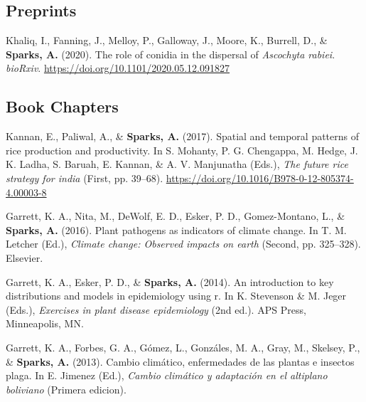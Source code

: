 \documentclass[11pt, a4paper]{awesome-cv}
\begin{document}
\endgroup

\hypertarget{preprints}{%
\subsection{Preprints}\label{preprints}}

\begingroup
\setlength{\parindent}{-0.5in}
\setlength{\leftskip}{0.5in}

\hypertarget{refs_preprints}{}
\leavevmode\hypertarget{ref-Khaliq2020}{}%
Khaliq, I., Fanning, J., Melloy, P., Galloway, J., Moore, K., Burrell, D., \& \textbf{Sparks, A.} (2020). The role of conidia in the dispersal of \emph{Ascochyta rabiei}. \emph{bioRxiv}. \url{https://doi.org/10.1101/2020.05.12.091827}

\endgroup

\hypertarget{book-chapters}{%
\subsection{Book Chapters}\label{book-chapters}}

\begingroup
\setlength{\parindent}{-0.5in}
\setlength{\leftskip}{0.5in}

\hypertarget{refs_books}{}
\leavevmode\hypertarget{ref-Kannan2017}{}%
Kannan, E., Paliwal, A., \& \textbf{Sparks, A.} (2017). Spatial and temporal patterns of rice production and productivity. In S. Mohanty, P. G. Chengappa, M. Hedge, J. K. Ladha, S. Baruah, E. Kannan, \& A. V. Manjunatha (Eds.), \emph{The future rice strategy for india} (First, pp. 39--68). \url{https://doi.org/10.1016/B978-0-12-805374-4.00003-8}

\leavevmode\hypertarget{ref-Garrett2016}{}%
Garrett, K. A., Nita, M., DeWolf, E. D., Esker, P. D., Gomez-Montano, L., \& \textbf{Sparks, A.} (2016). Plant pathogens as indicators of climate change. In T. M. Letcher (Ed.), \emph{Climate change: Observed impacts on earth} (Second, pp. 325--328). Elsevier.

\leavevmode\hypertarget{ref-Garrett2014}{}%
Garrett, K. A., Esker, P. D., \& \textbf{Sparks, A.} (2014). An introduction to key distributions and models in epidemiology using r. In K. Stevenson \& M. Jeger (Eds.), \emph{Exercises in plant disease epidemiology} (2nd ed.). APS Press, Minneapolis, MN.

\leavevmode\hypertarget{ref-Garrett2013}{}%
Garrett, K. A., Forbes, G. A., Gómez, L., Gonzáles, M. A., Gray, M., Skelsey, P., \& \textbf{Sparks, A.} (2013). Cambio climático, enfermedades de las plantas e insectos plaga. In E. Jimenez (Ed.), \emph{Cambio climático y adaptación en el altiplano boliviano} (Primera edicion).
\end{document}
